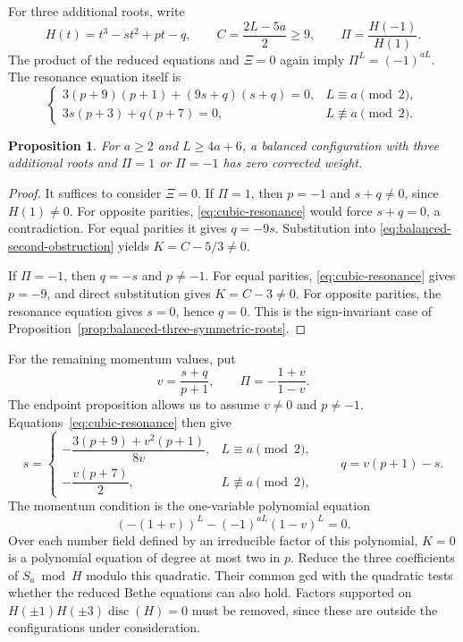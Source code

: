 \documentclass[11pt]{article}
\newtheorem{proposition}{Proposition}[section]
\theoremstyle{definition}
\begin{document}
For three additional roots, write
\[
 H(t)=t^3-st^2+pt-q,\qquad
 C=\frac{2L-5a}{2}\ge9,\qquad
 \Pi=\frac{H(-1)}{H(1)}.
\]
The product of the reduced equations and $\Xi=0$ again imply
$\Pi^L=(-1)^{aL}$. The resonance equation itself is
\begin{equation}\label{eq:cubic-resonance}
 \begin{cases}
 3(p+9)(p+1)+(9s+q)(s+q)=0,&L\equiv a\pmod2,\\
 3s(p+3)+q(p+7)=0,&L\not\equiv a\pmod2.
 \end{cases}
\end{equation}

\begin{proposition}\label{prop:balanced-cubic-endpoint-momentum}
For $a\ge2$ and $L\ge4a+6$, a balanced configuration with three
additional roots and $\Pi=1$ or $\Pi=-1$ has zero corrected weight.
\end{proposition}

\begin{proof}
It suffices to consider $\Xi=0$. If $\Pi=1$, then $p=-1$ and
$s+q\ne0$, since $H(1)\ne0$. For opposite parities,
\eqref{eq:cubic-resonance} would force $s+q=0$, a contradiction.
For equal parities it gives $q=-9s$. Substitution into
\eqref{eq:balanced-second-obstruction} yields $K=C-5/3\ne0$.

If $\Pi=-1$, then $q=-s$ and $p\ne-1$. For equal parities,
\eqref{eq:cubic-resonance} gives $p=-9$, and direct substitution
gives $K=C-3\ne0$. For opposite parities, the resonance equation
gives $s=0$, hence $q=0$. This is the sign-invariant case of
Proposition~\ref{prop:balanced-three-symmetric-roots}.
\end{proof}

For the remaining momentum values, put
\[
 v=\frac{s+q}{p+1},\qquad
 \Pi=-\frac{1+v}{1-v}.
\]
The endpoint proposition allows us to assume $v\ne0$ and $p\ne-1$.
Equations~\eqref{eq:cubic-resonance} then give
\begin{equation}\label{eq:cubic-momentum-parameterization}
 s=\begin{cases}
 -\dfrac{3(p+9)+v^2(p+1)}{8v},&L\equiv a\pmod2,\\[5pt]
 -\dfrac{v(p+7)}2,&L\not\equiv a\pmod2,
 \end{cases}
 \qquad q=v(p+1)-s.
\end{equation}
The momentum condition is the one-variable polynomial equation
\[
 (-(1+v))^L-(-1)^{aL}(1-v)^L=0.
\]
Over each number field defined by an irreducible factor of this
polynomial, $K=0$ is a polynomial equation of degree at most two in
$p$. Reduce the three coefficients of $S_a\bmod H$ modulo this
quadratic. Their common gcd with the quadratic tests whether the
reduced Bethe equations can also hold. Factors supported on
$H(\pm1)H(\pm3)\operatorname{disc}(H)=0$ must be removed, since
these are outside the configurations under consideration.
\end{document}
